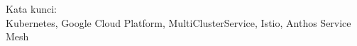 \vspace*{0.2cm}

\noindent Kata kunci: \\ Kubernetes, Google Cloud Platform, MultiClusterService, Istio, Anthos Service Mesh \\

\newpage
